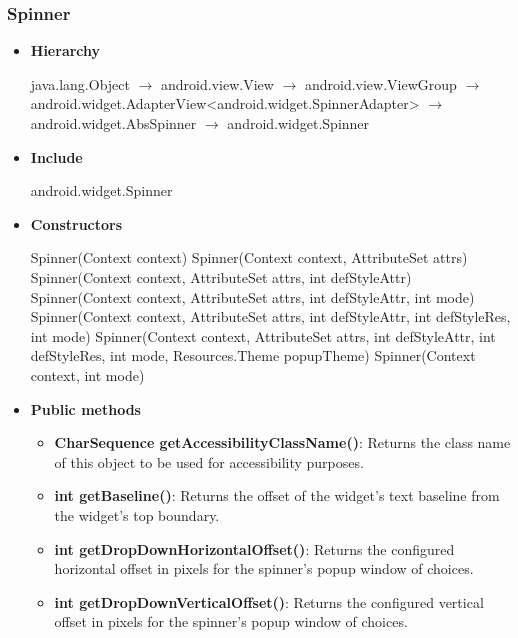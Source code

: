 \documentclass{report}
\begin{document}
    \subsubsection{Spinner}
    \begin{itemize}
        \item \textbf{Hierarchy} 
            \bigbreak \noindent 
            \begin{center}
                java.lang.Object $\to$	android.view.View $\to$	android.view.ViewGroup $\to$	android.widget.AdapterView<android.widget.SpinnerAdapter> $\to$	android.widget.AbsSpinner $\to$	android.widget.Spinner
            \end{center}
        \item \textbf{Include}
            \bigbreak \noindent 
            \begin{javacode}
                android.widget.Spinner
            \end{javacode}
        \item \textbf{Constructors}
            \bigbreak \noindent 
            \begin{javacode}
                Spinner(Context context)
                Spinner(Context context, AttributeSet attrs)
                Spinner(Context context, AttributeSet attrs, int defStyleAttr)
                Spinner(Context context, AttributeSet attrs, int defStyleAttr, int mode)
                Spinner(Context context, AttributeSet attrs, int defStyleAttr, int defStyleRes, int mode)
                Spinner(Context context, AttributeSet attrs, int defStyleAttr, int defStyleRes, int mode, Resources.Theme popupTheme)
                Spinner(Context context, int mode)
            \end{javacode}
        \item \textbf{Public methods}
            \begin{itemize}
                \item \textbf{CharSequence getAccessibilityClassName()}: Returns the class name of this object to be used for accessibility purposes.
                \item \textbf{int getBaseline()}: Returns the offset of the widget’s text baseline from the widget’s top boundary.
                \item \textbf{int getDropDownHorizontalOffset()}: Returns the configured horizontal offset in pixels for the spinner’s popup window of choices.
                \item \textbf{int getDropDownVerticalOffset()}: Returns the configured vertical offset in pixels for the spinner’s popup window of choices.

\end{itemize}
\end{itemize}
\end{document}
